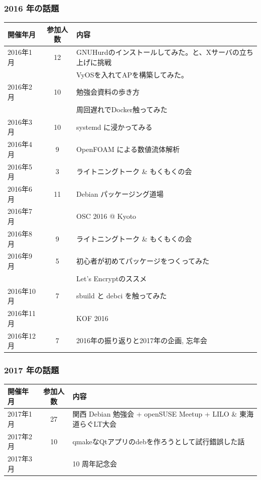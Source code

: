 \documentclass[cjk,dvipdfmx,10pt,compress,%
hyperref={bookmarks=true,bookmarksnumbered=true,bookmarksopen=false,%
colorlinks=false,%
pdftitle={第 121 回 関西 Debian 勉強会},%
pdfauthor={倉敷・のがた・佐々木・かわだ},%
pdfsubject={資料},%
}]{beamer}
\begin{document}
\begin{frame}[fragile]
  \frametitle{2016 年の話題}
    \begin{table}
        \begin{center}
          {\small
          \begin{tabular}{|l|c|p{20em}|}
            \hline
            開催年月  & 参加人数 & 内容 \\
            \hline
            2016年1月 & 12    & GNUHurdのインストールしてみた。と、Xサーバの立ち上げに挑戦 \\
                      &       & VyOSを入れてAPを構築してみた。\\
            2016年2月 & 10    & 勉強会資料の歩き方 \\
                      &       & 周回遅れでDocker触ってみた \\
            2016年3月 & 10    & systemd に浸かってみる \\
            2016年4月 & 9     & OpenFOAM による数値流体解析 \\
            2016年5月 & 3     & ライトニングトーク \& もくもくの会  \\
            2016年6月 & 11    & Debian パッケージング道場\\
            2016年7月 &       & OSC 2016 @ Kyoto \\
            2016年8月 & 9     & ライトニングトーク \& もくもくの会 \\
            2016年9月 & 5     & 初心者が初めてパッケージをつくってみた \\
                      &       & Let's Encryptのススメ \\
            2016年10月& 7     & sbuild と debci を触ってみた \\
            2016年11月&       & KOF 2016 \\
            2016年12月& 7      & 2016年の振り返りと2017年の企画, 忘年会 \\
            \hline
          \end{tabular}
          }
        \end{center}
    \end{table}
\end{frame}

\begin{frame}[fragile]
  \frametitle{2017 年の話題}
    \begin{table}
        \begin{center}
          \begin{tabular}{|l|c|p{20em}|}
            \hline
            開催年月  & 参加人数 & 内容 \\
            \hline
            2017年1月 & 27    & 関西 Debian 勉強会 + openSUSE Meetup + LILO \& 東海道らぐLT大会 \\
            2017年2月 & 10    & qmakeなQtアプリのdebを作ろうとして試行錯誤した話 \\
            2017年3月 &     & 10 周年記念会 \\
            \hline
          \end{tabular}
        \end{center}
    \end{table}
\end{frame}
\end{document}
